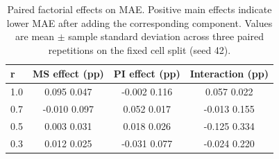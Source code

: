 \begin{table}[htbp]
\caption{Paired factorial effects on MAE. Positive main effects indicate lower MAE after adding the corresponding component. Values are mean $\pm$ sample standard deviation across three paired repetitions on the fixed cell split (seed 42).}
\label{tab:factorial_effects}
\centering
\setlength{\tabcolsep}{3.5pt}
\begin{tabular*}{\textwidth}{@{\extracolsep{\fill}}lccc@{}}
\toprule
r & MS effect (pp) & PI effect (pp) & Interaction (pp) \\
\midrule
1.0 & 0.095 \textpm{} 0.047 & -0.002 \textpm{} 0.116 & 0.057 \textpm{} 0.022 \\
0.7 & -0.010 \textpm{} 0.097 & 0.052 \textpm{} 0.017 & -0.013 \textpm{} 0.155 \\
0.5 & 0.003 \textpm{} 0.031 & 0.018 \textpm{} 0.026 & -0.125 \textpm{} 0.334 \\
0.3 & 0.012 \textpm{} 0.025 & -0.031 \textpm{} 0.077 & -0.024 \textpm{} 0.220 \\
\bottomrule
\end{tabular*}
\end{table}
